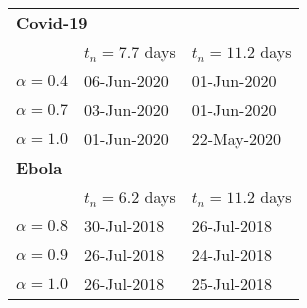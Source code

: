 \begin{tabular}{lll} 
\hline
\multicolumn{3}{l}{ \bf Covid-19} \\ 
 &  $t_n=7.7$ days & $t_n=11.2$ days \\ 
$\alpha=0.4$ & 06-Jun-2020 & 01-Jun-2020 \\ 
 $\alpha=0.7$ & 03-Jun-2020 & 01-Jun-2020 \\ 
 $\alpha=1.0$ & 01-Jun-2020 & 22-May-2020 \\ 
 \hline
\multicolumn{3}{l}{ \bf Ebola} \\ 
 &  $t_n=6.2$ days & $t_n=11.2$ days \\ 
$\alpha=0.8$ & 30-Jul-2018 & 26-Jul-2018 \\ 
 $\alpha=0.9$ & 26-Jul-2018 & 24-Jul-2018 \\ 
 $\alpha=1.0$ & 26-Jul-2018 & 25-Jul-2018 \\ 
 \hline
\end{tabular} 
